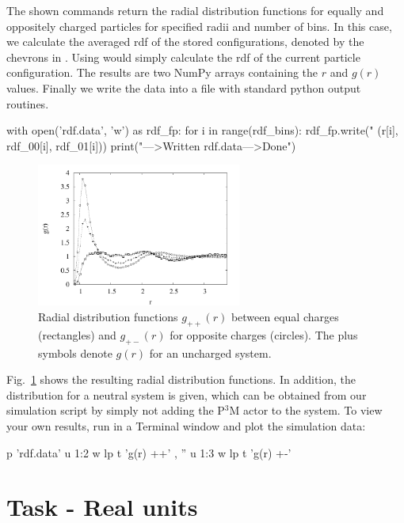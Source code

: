 \documentclass[
a4paper,                        %
11pt,                           %
twoside,                        %
footsepline,                    %
headsepline,                    %
headexclude,                    %
footexclude,                    %
pagesize,                       %
]{scrartcl}
\begin{document}
The shown  commands return the radial distribution functions for
equally and oppositely charged particles for specified radii and number of bins. 
In this case, we calculate the averaged rdf of the stored
configurations, denoted by the chevrons in . Using
 would simply calculate the rdf of the current particle
configuration. The results are two NumPy arrays containing the $r$ and $g(r)$
values. Finally we write the data into a file with standard python output routines.

\begin{pypresso}
with open('rdf.data', 'w') as rdf_fp:
    for i in range(rdf_bins):
        rdf_fp.write("%
                (r[i], rdf_00[i], rdf_01[i]))
print("\n--->Written rdf.data\n--->Done")
\end{pypresso}

\begin{figure}[tb]
  \centering
  \includegraphics[width=0.6\textwidth]{figures/nacl-rdf}
  \caption{Radial distribution functions $g_{++}(r)$ between equal
    charges (rectangles) and $g_{+-}(r)$ for opposite charges
    (circles). The plus symbols denote $g(r)$ for an uncharged
    system.}
  \label{fig:rdf}
\end{figure}

Fig.~\ref{fig:rdf} shows the resulting radial distribution functions. In
addition, the distribution for a neutral system is given, which can be obtained
from our simulation script by simply not adding the P$^3$M actor to the system.
To view your own results, run  in a Terminal window
and plot the simulation data:

\begin{pypresso}
p 'rdf.data' u 1:2 w lp t 'g(r) ++' , '' u 1:3 w lp t 'g(r) +-'
\end{pypresso}

\section{Task - Real units}
\end{document}
